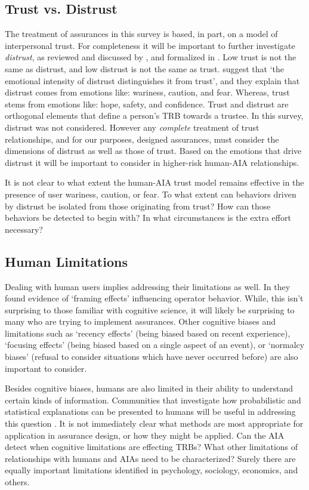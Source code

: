 \subsection{Trust vs. Distrust}
The treatment of assurances in this survey is based, in part, on a model of interpersonal trust. For completeness it will be important to further investigate \textit{distrust}, as reviewed and discussed by \citet{Lewicki1998-ox}, and formalized in \citet{McKnight2001-gz}. Low trust is not the same as distrust, and low distrust is not the same as trust. \citet{McKnight2001-gz} suggest that `the emotional intensity of distrust distinguishes it from trust', and they explain that distrust comes from emotions like: wariness, caution, and fear. Whereas, trust stems from emotions like: hope, safety, and confidence. Trust and distrust are orthogonal elements that define a person's TRB towards a trustee. In this survey, distrust was not considered. However any \emph{complete} treatment of trust relationships, and for our purposes, designed assurances, must consider the dimensions of distrust as well as those of trust. Based on the emotions that drive distrust it will be important to consider in higher-risk human-AIA relationships.

It is not clear to what extent the human-AIA trust model remains effective in the presence of user wariness, caution, or fear. To what extent can behaviors driven by distrust be isolated from those originating from trust? How can those behaviors be detected to begin with? In what circumstances is the extra effort necessary?

\subsection{Human Limitations}
Dealing with human users implies addressing their limitations as well. In \cite{Freedy2007-sg,Riley1996-qm} they found evidence of `framing effects' influencing operator behavior. While, this isn't surprising to those familiar with cognitive science, it will likely be surprising to many who are trying to implement assurances. Other cognitive biases and limitations such as `recency effects' (being biased based on recent experience), `focusing effects' (being biased based on a single aspect of an event), or `normalcy biases' (refusal to consider situations which have never occurred before) are also important to consider. 

Besides cognitive biases, humans are also limited in their ability to understand certain kinds of information. Communities that investigate how probabilistic and statistical explanations can be presented to humans will be useful in addressing this question \cite{Rouse1986-dz,Wallace2001-fm,Kuhn1997-qc,Lomas2012-ie,Swartout1983-ko}. It is not immediately clear what methods are most appropriate for application in assurance design, or how they might be applied. Can the AIA detect when cognitive limitations are effecting TRBs? What other limitations of relationships with humans and AIAs need to be characterized? Surely there are equally important limitations identified in psychology, sociology, economics, and others.



